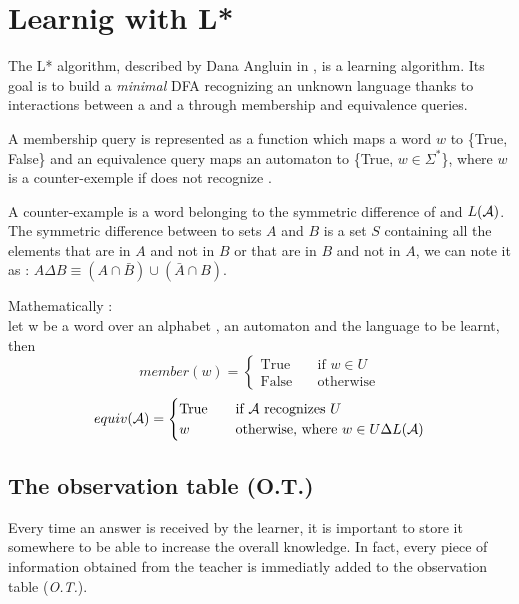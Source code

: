 \section{Learnig with L* }
\label{section:L}

The L* algorithm, described by Dana Angluin in \cite{LPaper}, is a learning algorithm. Its goal is to build a \textit{minimal} DFA recognizing an unknown language \langU{} thanks to interactions between a \learner{} and a \teacher{} through membership and equivalence queries.

\begin{definition}
  A membership query is represented as a function which maps a word $w$ to \{True, False\} and an equivalence query maps an automaton \automaton{} to \{True, $w \in \Sigma^*$\}, where $w$ is a counter-exemple if \automaton{} does not recognize \langU{}.
\end{definition}

\begin{definition}
  A counter-example is a word belonging to the symmetric difference of \langU{} and $L(\mathcal{A}{})$. The symmetric difference between to sets $A$ and $B$ is a set $S$ containing all the elements that are in $A$ and not in $B$ or that are in $B$ and not in $A$, we can note it as : $A \Delta B \equiv (A \cap \bar{B}) \cup (\bar{A} \cap B)$.
\end{definition}

Mathematically :\\
let w be a word over an alphabet \alphabet{}, \automaton{} an automaton and \langU{} the language to be learnt, then
\[ member(w) =
  \begin{cases}
    \text{True}  & \quad \text{if } w \in U \\
    \text{False} & \quad \text{otherwise}
  \end{cases}
\]
\[ equiv(\mathcal{A}{}) =
  \begin{cases}
    \text{True} & \quad \text{if } \mathcal{A}{} \text{ recognizes } U           \\
    w           & \quad \text{otherwise, where } w \in U \Delta L(\mathcal{A}{})
  \end{cases}
\]


\subsection{The observation table (O.T.)}
Every time an answer is received by the learner, it is important to store it somewhere to be able to increase the overall knowledge. In fact, every piece of information obtained from the teacher is immediatly added to the observation table (\textit{O.T.}).

